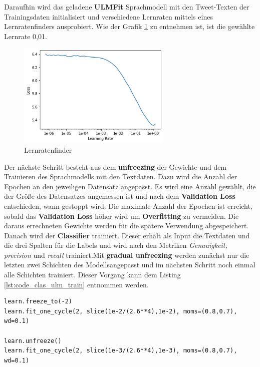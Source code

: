Daraufhin wird das geladene \textbf{ULMFit} Sprachmodell mit den Tweet-Texten der Trainingsdaten initialisiert und verschiedene Lernraten mittels eines Lernratenfinders ausprobiert. Wie der Grafik \ref{fig:lr_ulmfit} zu entnehmen ist, ist die gew\"ahlte Lernrate 0,01.
\begin{figure}[!ht]
\centering
\includegraphics[height=5cm]{pics/lr_finder_ulmfit.png}
\caption{Lernratenfinder \cite{elmoex}}
\label{fig:lr_ulmfit}
\end{figure}
Der n\"achste Schritt besteht aus dem \textbf{unfreezing} der Gewichte und dem Trainieren des Sprachmodells mit den Textdaten. Dazu wird die Anzahl der Epochen an den jeweiligen Datensatz angepasst. Es wird eine Anzahl gew\"ahlt, die der Gr\"o{\ss}e des Datensatzes angemessen ist und nach dem \textbf{Validation Loss} entschieden, wann gestoppt wird: Die maximale Anzahl der Epochen ist erreicht, sobald das \textbf{Validation Loss} h\"oher wird um \textbf{Overfitting} zu vermeiden. Die daraus errechneten Gewichte werden f\"ur die sp\"atere Verwendung abgespeichert.\\
Danach wird der \textbf{Classifier} trainiert. Dieser erh\"alt als Input die Textdaten und die drei Spalten f\"ur die Labels und wird nach den Metriken \textit{Genauigkeit, precision} und \textit{recall} trainiert.Mit \textbf{gradual unfreezing} werden zun\"achst nur die letzten zwei Schichten des Modellsangepasst und im n\"achsten Schritt noch einmal alle Schichten trainiert. Dieser Vorgang kann dem Listing \ref{lst:code_clas_ulm_train} entnommen werden.
\lstset{language=Python}
\lstset{frame=lines}
\lstset{captionpos=b}
\lstset{basicstyle=\footnotesize}
\begin{lstlisting}
learn.freeze_to(-2)
learn.fit_one_cycle(2, slice(1e-2/(2.6**4),1e-2), moms=(0.8,0.7), wd=0.1)

learn.unfreeze()
learn.fit_one_cycle(2, slice(1e-3/(2.6**4),1e-3), moms=(0.8,0.7), wd=0.1)
\end{lstlisting}

